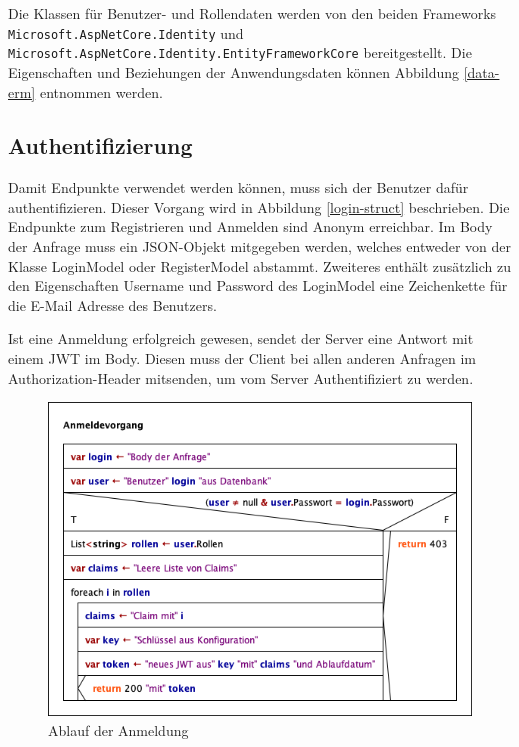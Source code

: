Die Klassen für Benutzer- und Rollendaten werden von den beiden Frameworks \texttt{Microsoft.\-AspNetCore\-.Identity} und \texttt{Microsoft.\-AspNetCore.\-Identity.\linebreak\-Entity\-Framework\-Core} bereitgestellt. 
Die Eigenschaften und Beziehungen der Anwendungsdaten können Abbildung \vref{data-erm} entnommen werden.

\subsection{Authentifizierung}
Damit Endpunkte verwendet werden können, muss sich der Benutzer dafür authentifizieren. 
Dieser Vorgang wird in Abbildung \vref{login-struct} beschrieben.
Die Endpunkte zum Registrieren und Anmelden sind Anonym erreichbar.
Im Body der Anfrage muss ein JSON-Objekt mitgegeben werden, welches entweder von der Klasse LoginModel oder RegisterModel abstammt.
Zweiteres enthält zusätzlich zu den Eigenschaften Username und Password des LoginModel eine Zeichenkette für die E-Mail Adresse des Benutzers.

Ist eine Anmeldung erfolgreich gewesen, sendet der Server eine Antwort mit einem JWT im Body.
Diesen muss der Client bei allen anderen Anfragen im Authorization-Header mitsenden, um vom Server Authentifiziert zu werden.

\begin{figure}[ht]
	\centering
	\includegraphics[width=0.7\linewidth]{Anmeldevorgang.png}
	\caption{Ablauf der Anmeldung}
	\label{login-struct}
\end{figure}

